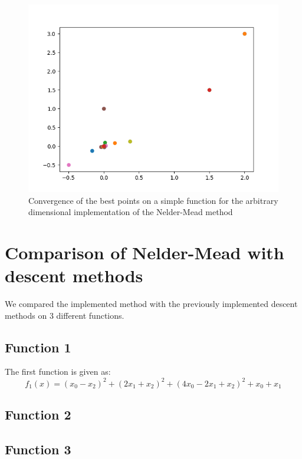 \documentclass[9pt]{IEEEtran}
\begin{document}
\begin{figure}[h]
    \includegraphics[width=\columnwidth]{convergence1.png}
    \caption{Convergence of the best points on a simple function 
    for the arbitrary dimensional implementation of the Nelder-Mead method}
    \label{fig:nelder}
\end{figure}

\section{Comparison of Nelder-Mead with descent methods}
We compared the implemented method with the previously implemented descent 
methods on 3 different functions. 
\subsection*{Function 1}
The first function is given as:
\[
f_1(x) = (x_0 - x_2)^2 + (2x_1 + x_2)^2 + (4x_0 - 2x_1 + x_2)^2 + x_0 + x_1
\]



\subsection*{Function 2}
\subsection*{Function 3}
\end{document}
